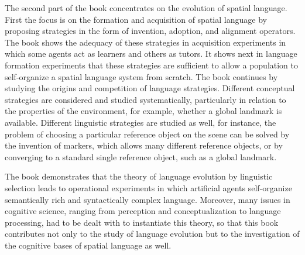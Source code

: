 The second part of the book concentrates on the evolution of spatial language.
First the focus is on the formation and acquisition of 
spatial language by proposing strategies in the form of invention, adoption, 
and alignment operators. The book shows the adequacy of these strategies 
in acquisition experiments in which some agents act as learners
and others as tutors. It shows next in language formation experiments
that these strategies are sufficient to allow a population to self-organize 
a spatial language system from scratch.
The book continues by studying the origins and competition of 
language strategies. Different conceptual strategies are considered and studied 
systematically, particularly in relation to
the properties of the environment, for example, whether a global landmark is available.
Different linguistic strategies are studied as well,
for instance, the problem of choosing a particular reference object on the scene can be solved
by the invention of markers, which allows many different reference objects, or by converging
to a standard single reference object, such as a global landmark.

The book demonstrates that the theory of language evolution 
by linguistic selection leads to operational experiments in which artificial agents 
self-organize semantically rich and syntactically complex language. Moreover, 
many issues in cognitive science, ranging from perception and conceptualization to
language processing, had to be dealt with to instantiate this theory, so that this book 
contributes not only to the study of language evolution but to the investigation 
of the cognitive bases of spatial language as well.

